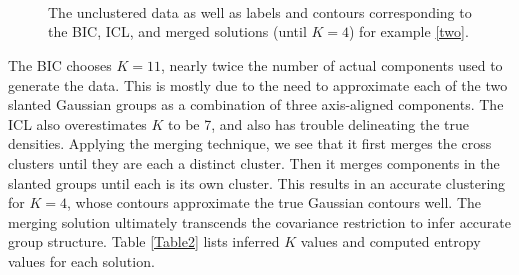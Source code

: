 \documentclass{uwstat572}
\renewcommand\;{\,}
\begin{document}
\begin{figure}
\begin{center}
\\ \vspace{-1em}
\\ \vspace{-1em}
\\ \vspace{-1em}
\end{center}
\vspace{-1em}
\caption{
The unclustered data as well as labels and contours corresponding to the BIC, ICL, and merged solutions (until $K = 4$) for example \ref{two}.}
\label{Example2}
\end{figure}

The BIC chooses $K = 11$, nearly twice the number of actual components used to generate the data.
This is mostly due to the need to approximate each of the two slanted Gaussian groups as a combination of three axis-aligned components.
The ICL also overestimates $K$ to be 7, and also has trouble delineating the true densities.
Applying the merging technique, we see that it first merges the cross clusters until they are each a distinct cluster.
Then it merges components in the slanted groups until each is its own cluster.
This results in an accurate clustering for $K = 4$, whose contours approximate the true Gaussian contours well.
The merging solution ultimately transcends the covariance restriction to infer accurate group structure.
Table \ref{Table2} lists inferred $K$ values and computed entropy values for each solution.
\end{document}
